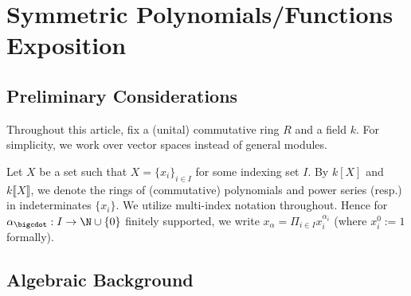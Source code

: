 \documentclass[12pt]{article}
\begin{document}
\newpage

\section{Symmetric Polynomials/Functions Exposition}


\subsection*{Preliminary Considerations} 
Throughout this article, fix a (unital) commutative ring $ R $ and a field $ k $. For simplicity, we work over vector spaces instead of general modules.

\begin{notation*}
  Let $ X $ be a set such that $ X = \{x_{i}\}_{i\in I} $ for some indexing set $ I $. By $ k[X] $ and $ k\llbracket X \rrbracket $, we denote the rings of (commutative) polynomials and power series (resp.) in indeterminates $ \{x_{i}\} $. We utilize multi-index notation throughout. Hence for $ \alpha_{\bigcdot}:I\to \N\cup\{0\} $ finitely supported, we write $ x_{\alpha} = \Pi_{i\in I}x_{i}^{\alpha_{i}} $ (where $ x_{i}^0 := 1 $ formally).
\end{notation*}

\subsection{Algebraic Background}
\end{document}
